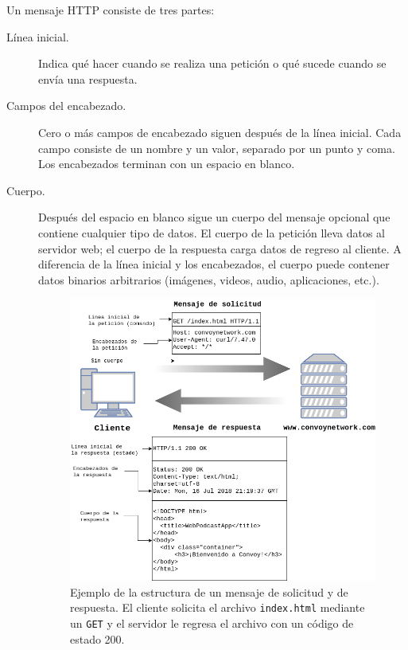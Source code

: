 Un mensaje HTTP consiste de tres partes:
\begin{description}
\item[{Línea inicial.}] \leavevmode
Indica qué hacer cuando se realiza una petición o qué sucede cuando
se envía una respuesta.

\item[{Campos del encabezado.}] \leavevmode
Cero o más campos de encabezado siguen después de la línea inicial.
Cada campo consiste de un nombre y un valor, separado por un punto y
coma. Los encabezados terminan con un espacio en blanco.

\item[{Cuerpo.}] \leavevmode
Después del espacio en blanco sigue un cuerpo del mensaje opcional
que contiene cualquier tipo de datos. El cuerpo de la petición
lleva datos al servidor web; el cuerpo de la respuesta carga
datos de regreso al cliente. A diferencia de la línea inicial y los
encabezados, el cuerpo puede contener datos binarios arbitrarios
(imágenes, videos, audio, aplicaciones, etc.).

\begin{figure}
    \centering
    \includegraphics[scale=0.5]{figures/http_message.png}
    \caption{Ejemplo de la estructura de un mensaje de solicitud y de respuesta. El cliente solicita el archivo \texttt{index.html} mediante
    un \texttt{GET} y el servidor le regresa el archivo con un código de estado
    200.}
    \label{http-message}
\end{figure}

\end{description}


